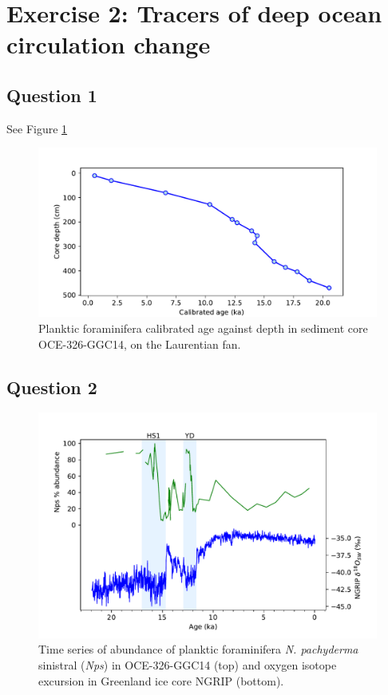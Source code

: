 \section{Exercise 2: Tracers of deep ocean circulation change}
\label{sec:E2}

\subsection{Question 1}
\label{sec:Q2.1}
See Figure \ref{fig:age_depth}

\begin{figure}[!htbp]
\includegraphics[width=\textwidth]{img/line_age_depth.pdf}
    \caption{Planktic foraminifera calibrated age against depth in sediment core OCE-326-GGC14, on the Laurentian fan.}
        \label{fig:age_depth}
\end{figure}

\subsection{Question 2}
\label{sec:Q2.2}

\begin{figure}[!htbp]
\includegraphics[width=\textwidth]{img/timeseries_nps_ngrip}
    \caption{Time series of abundance of planktic foraminifera \emph{N. pachyderma} sinistral (\emph{Nps}) in OCE-326-GGC14 (top) and oxygen isotope excursion in Greenland ice core NGRIP (bottom).}
        \label{fig:nps_ngrip}
\end{figure}

